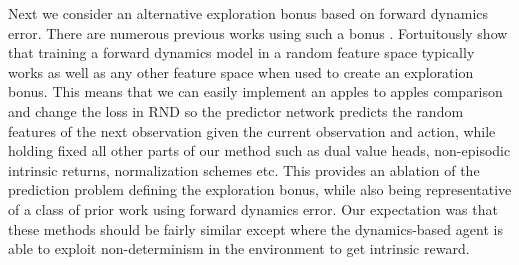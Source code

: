 \documentclass{article} %
\begin{document}
Next we consider an alternative exploration bonus based on forward dynamics error. There are numerous previous works using such a bonus \citep{schmidhuber_curiosity,stadie2015incentivizing,josh_surprise,pathakICMl17curiosity,burda18largescale}. Fortuitously \citet{burda18largescale} show that training a forward dynamics model in a random feature space typically works as well as any other feature space when used to create an exploration bonus. This means that we can easily implement an apples to apples comparison and change the loss in RND so the predictor network predicts the random features of the next observation given the current observation and action, while holding fixed all other parts of our method such as dual value heads, non-episodic intrinsic returns, normalization schemes etc. This provides an ablation of the prediction problem defining the exploration bonus, while also being representative of a class of prior work using forward dynamics error. Our expectation was that these methods should be fairly similar except where the dynamics-based agent is able to exploit non-determinism in the environment to get intrinsic reward.
\end{document}

